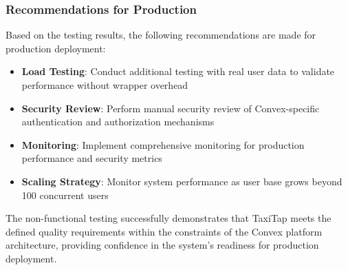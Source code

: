 \documentclass[12pt]{article}
\begin{document}
\subsubsection{Recommendations for Production}
Based on the testing results, the following recommendations are made for production deployment:
\begin{itemize}
    \item \textbf{Load Testing}: Conduct additional testing with real user data to validate performance without wrapper overhead
    \item \textbf{Security Review}: Perform manual security review of Convex-specific authentication and authorization mechanisms
    \item \textbf{Monitoring}: Implement comprehensive monitoring for production performance and security metrics
    \item \textbf{Scaling Strategy}: Monitor system performance as user base grows beyond 100 concurrent users
\end{itemize}

The non-functional testing successfully demonstrates that TaxiTap meets the defined quality requirements within the constraints of the Convex platform architecture, providing confidence in the system's readiness for production deployment.
\end{document}
